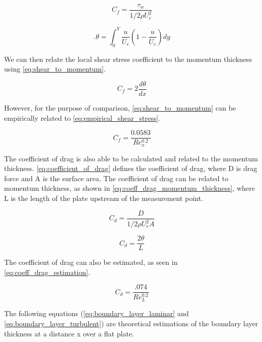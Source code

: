 \begin{equation} \label{eq:shear_stress_coefficient}
    C_f = \frac{\tau_w}{1/2 \rho U_e^2}
\end{equation}

\begin{equation} \label{eq:momentum_thickness}. 
    \theta = \int_0^Y\frac{u}{U_e}\left(1 - \frac{u}{U_e}\right)dy
\end{equation}

\noindent We can then relate the local shear stress coefficient to the momentum thickness using \autoref{eq:shear_to_momentum}. 

\begin{equation} \label{eq:shear_to_momentum}
    C_f = 2\frac{d\theta}{dx}
\end{equation}

\noindent However, for the purpose of comparison, \autoref{eq:shear_to_momentum} can be empirically related to \autoref{eq:empirical_shear_stress}.

\begin{equation} \label{eq:empirical_shear_stress}
    C_f = \frac{0.0583}{Re_x^{0.2}}
\end{equation}

\noindent The coefficient of drag is also able to be calculated and related to the momentum thickness. \autoref{eq:coefficient_of_drag} defines the coefficient of drag, where \gls{D} is drag force and \gls{A} is the surface area. The coefficient of drag can be related to momentum thickness, as shown in \autoref{eq:coeff_drag_momentum_thickness}, where \gls{L} is the length of the plate upstream of the measurement point. 


\begin{equation} \label{eq:coefficient_of_drag}
    C_d = \frac{D}{1/2 \rho U_e^2 A}
\end{equation}

\begin{equation} \label{eq:coeff_drag_momentum_thickness}
    C_d = \frac{2\theta}{L}
\end{equation}

\noindent The coefficient of drag can also be estimated, as seen in \autoref{eq:coeff_drag_estimation}.

\begin{equation} \label{eq:coeff_drag_estimation}
    C_d = \frac{.074}{Re_L^{0.2}}
\end{equation}

\noindent The following equations (\autoref{eq:boundary_layer_laminar} and \autoref{eq:boundary_layer_turbulent}) are theoretical estimations of the boundary layer thickness at a distance \gls{x} over a flat plate.

